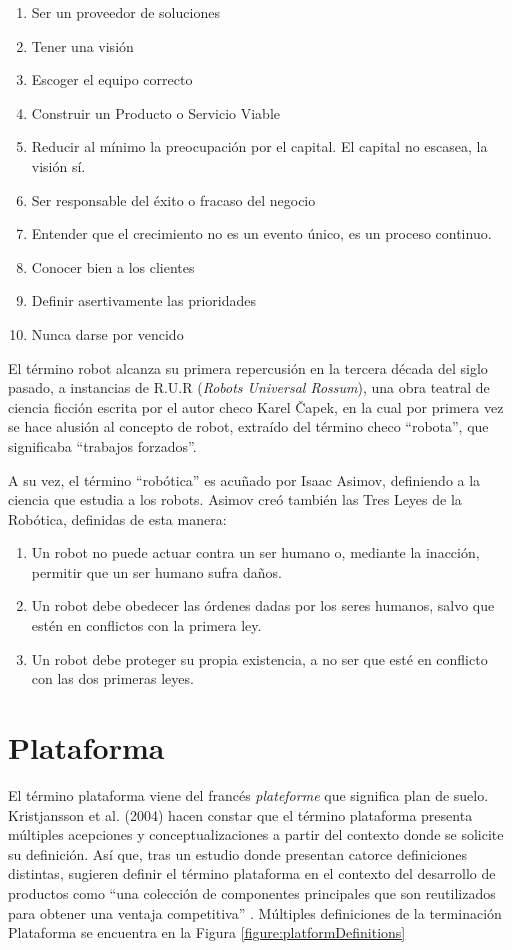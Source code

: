 \begin{enumerate}
	\itemsep1pt \parskip1pt 
	\item Ser un proveedor de soluciones
	\item Tener una visión
	\item Escoger el equipo correcto
	\item Construir un Producto o Servicio Viable
	\item Reducir al mínimo la preocupación por el capital. El capital no escasea, la visión sí.
	\item Ser responsable del éxito o fracaso del negocio
	\item Entender que el crecimiento no es un evento único, es un proceso continuo.
	\item Conocer bien a los clientes
	\item Definir asertivamente las prioridades
	\item Nunca darse por vencido
\end{enumerate}


El término robot alcanza su primera repercusión en la tercera década del siglo pasado, a instancias de R.U.R (\textit{Robots Universal Rossum}), una obra teatral de ciencia ficción escrita por el autor checo Karel Čapek, en la cual por primera vez se hace alusión al concepto de robot, extraído del término checo ``robota'', que significaba ``trabajos forzados''.

A su vez, el término ``robótica'' es acuñado por Isaac Asimov, definiendo a la ciencia que estudia a los robots. Asimov creó también las Tres Leyes de la Robótica, definidas de esta manera:

\begin{enumerate}
	\itemsep1pt \parskip1pt 
	\item Un robot no puede actuar contra un ser humano o, mediante la inacción, permitir que un ser humano sufra daños.
	\item Un robot debe obedecer las órdenes dadas por los seres humanos, salvo que estén en conflictos con la primera ley.
	\item Un robot debe proteger su propia existencia, a no ser que esté en conflicto con las dos primeras leyes.
\end{enumerate}

\section{Plataforma}
El término plataforma viene del francés 
\textit{plateforme} que significa plan de suelo.
Kristjansson et al. (2004) hacen constar que el término plataforma presenta múltiples acepciones y conceptualizaciones a partir del contexto donde se solicite su definición. Así que, tras un estudio donde presentan catorce definiciones distintas, sugieren definir el término plataforma en el contexto del desarrollo de productos como “una colección de componentes principales que son reutilizados para obtener una ventaja competitiva”
\cite{kristjansson2004term}. Múltiples definiciones de la terminación Plataforma se encuentra en la Figura \ref{figure:platformDefinitions}

